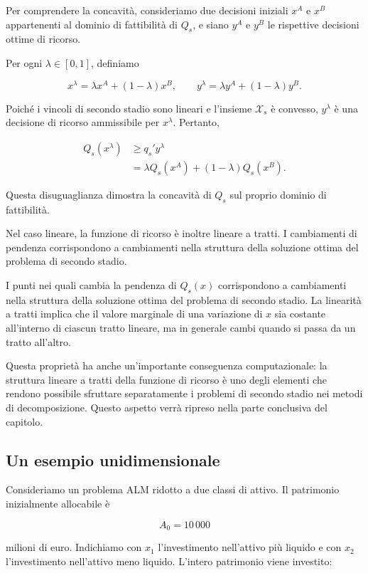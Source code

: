Per comprendere la concavit\`{a}, consideriamo due
decisioni iniziali $x^A$ e $x^B$ appartenenti al
dominio di fattibilit\`{a} di $Q_s$, e siano
$y^A$ e $y^B$ le rispettive decisioni ottime
di ricorso.

Per ogni $\lambda\in[0,1]$, definiamo

\[
x^\lambda=\lambda x^A+(1-\lambda)x^B,
\qquad
y^\lambda=\lambda y^A+(1-\lambda)y^B.
\]

Poich\'{e} i vincoli di secondo stadio sono
lineari e l'insieme $\mathcal X_s$ \`{e}
convesso, $y^\lambda$ \`{e} una decisione
di ricorso ammissibile per $x^\lambda$.
Pertanto,

\[
\begin{aligned}
Q_s(x^\lambda)
&\geq q_s'y^\lambda\\
&=\lambda Q_s(x^A)
 +(1-\lambda)Q_s(x^B).
\end{aligned}
\]

Questa disuguaglianza dimostra la concavit\`{a}
di $Q_s$ sul proprio dominio di fattibilit\`{a}.

Nel caso lineare, la funzione di ricorso \`{e}
inoltre lineare a tratti. I cambiamenti di
pendenza corrispondono a cambiamenti nella
struttura della soluzione ottima del problema
di secondo stadio.



I punti nei quali cambia la pendenza di $Q_s(x)$ corrispondono a cambiamenti
nella struttura della soluzione ottima del problema di secondo stadio. 
La linearit\`a a tratti implica che il valore marginale di una variazione di $x$ sia costante all'interno di ciascun tratto lineare, ma in generale cambi
quando si passa da un tratto all'altro.

Questa propriet\`a ha anche un'importante conseguenza computazionale: la
struttura lineare a tratti della funzione di ricorso \`e uno degli elementi
che rendono possibile sfruttare separatamente i problemi di secondo stadio
nei metodi di decomposizione. Questo aspetto verr\`a ripreso nella parte
conclusiva del capitolo.

\subsection{Un esempio unidimensionale}


Consideriamo un problema ALM ridotto a due classi di attivo. Il patrimonio
inizialmente allocabile \`e

\[
A_0=10\,000
\]

\noindent milioni di euro. Indichiamo con $x_1$ l'investimento nell'attivo pi\`u
liquido e con $x_2$ l'investimento nell'attivo meno liquido. L'intero
patrimonio viene investito:

